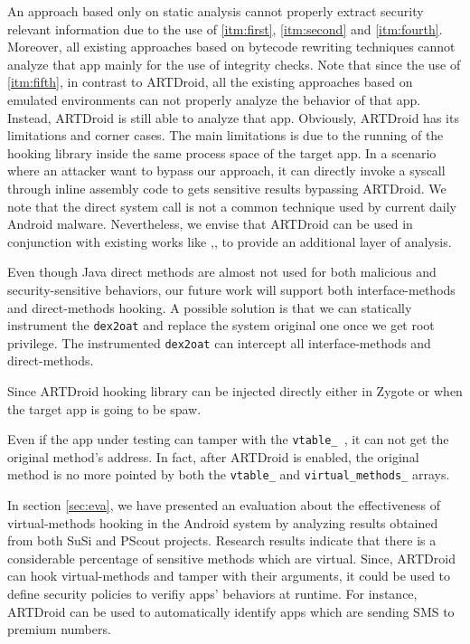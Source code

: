 An approach based only on static analysis cannot properly extract security relevant information due to the use of \ref{itm:first}, \ref{itm:second} and \ref{itm:fourth}. Moreover, all existing approaches based on bytecode rewriting techniques cannot analyze that app mainly for the use of integrity checks. Note that since the use of \ref{itm:fifth}, in contrast to ARTDroid, all the existing approaches based on emulated environments can not  properly analyze the behavior of that app. Instead, ARTDroid is still able to analyze that app. Obviously, ARTDroid has its limitations and corner cases. The main limitations is due to the running of the hooking library inside the same process space of the target app. In a scenario where an attacker want to bypass our approach, it can directly invoke a syscall through inline assembly code to gets sensitive results bypassing ARTDroid. We note that the direct system call is not a common technique used by current daily Android malware. Nevertheless, we envise that ARTDroid can be used in conjunction with existing works like \cite{tam2015copperdroid},\cite{zhauniarovich2015stadyna}, \cite{xu2012aurasium}  to provide an additional layer of analysis.



Even though Java direct methods are almost not used for both malicious and security-sensitive behaviors, our future work will support both interface-methods and direct-methods hooking. A possible solution is that we can statically instrument the  {\tt dex2oat} and replace the system original one once we get root privilege. The instrumented {\tt dex2oat} can intercept all interface-methods and direct-methods.

Since ARTDroid hooking library can be injected directly either in Zygote or when the target app is going to be spaw.

Even if the app under testing can tamper with the {\tt vtable\_ }, it can not get the original method's address. In fact, after ARTDroid is enabled, the original method is no more pointed by both the {\tt vtable\_} and {\tt virtual\_methods\_} arrays. 

In section \ref{sec:eva}, we have presented an evaluation about the effectiveness of virtual-methods hooking in the Android system by analyzing results obtained from both SuSi\cite{SuSi} and PScout\cite{au2012pscout} projects. Research results indicate that there is a considerable percentage of sensitive methods which are virtual. Since, ARTDroid can hook virtual-methods and tamper with their arguments, it could be used to define security policies to verifiy apps' behaviors at runtime. For instance, ARTDroid can be used to automatically identify apps which are sending SMS to premium numbers. 


